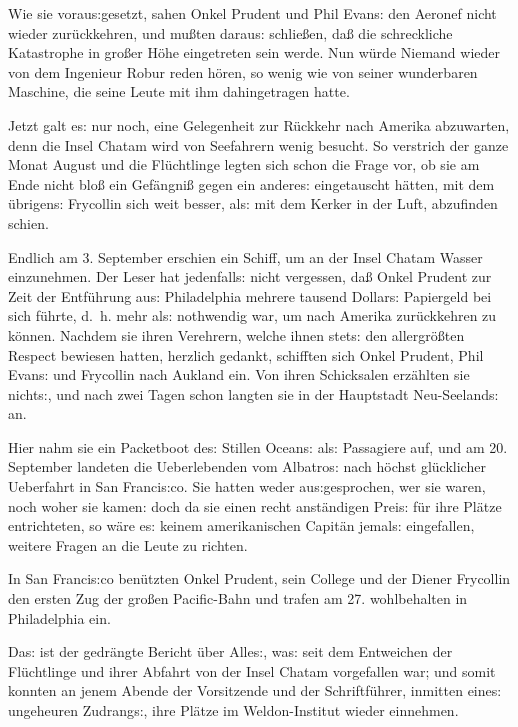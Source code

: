 \documentclass[oneside,12pt]{book}
\newcommand{\s}{s:}
\begin{document}
Wie sie vorau{\s}gesetzt, sahen Onkel Prudent und Phil Evan{\s} den
Aeronef nicht wieder zur\"uckkehren, und mu{\ss}ten darau{\s}
schlie{\ss}en, da{\ss} die schreckliche Katastrophe in gro{\ss}er
H\"ohe eingetreten sein werde. Nun w\"urde Niemand wieder von dem
Ingenieur Robur reden h\"oren, so wenig wie von seiner wunderbaren
Maschine, die seine Leute mit ihm dahingetragen hatte.

Jetzt galt e{\s} nur noch, eine Gelegenheit zur R\"uckkehr nach
Amerika abzuwarten, denn die Insel Chatam wird von Seefahrern wenig
besucht. So verstrich der ganze Monat August und die Fl\"uchtlinge
legten sich schon die Frage vor, ob sie am Ende nicht blo{\ss} ein
Gef\"angni{\ss} gegen ein andere{\s} eingetauscht h\"atten, mit dem
\"ubrigen{\s} Frycollin sich weit besser, al{\s} mit dem
{\glqq}Kerker in der Luft{\grqq}, abzufinden schien.

Endlich am 3. September erschien ein Schiff, um an der Insel Chatam
Wasser einzunehmen. Der Leser hat jedenfall{\s} nicht vergessen,
da{\ss} Onkel Prudent zur Zeit der Entf\"uhrung au{\s} Philadelphia
mehrere tausend Dollar{\s} Papiergeld bei sich f\"uhrte, d.~h. mehr
al{\s} nothwendig war, um nach Amerika zur\"uckkehren zu k\"onnen.
Nachdem sie ihren Verehrern, welche ihnen stet{\s} den
allergr\"o{\ss}ten Respect bewiesen hatten, herzlich gedankt,
schifften sich Onkel Prudent, Phil Evan{\s} und Frycollin nach
Aukland ein. Von ihren Schicksalen erz\"ahlten sie nicht{\s}, und
nach zwei Tagen schon langten sie in der Hauptstadt Neu-Seeland{\s}
an.

Hier nahm sie ein Packetboot de{\s} Stillen Ocean{\s} al{\s}
Passagiere auf, und am 20. September landeten die Ueberlebenden vom
{\glqq}Albatro{\s}{\grqq} nach h\"ochst gl\"ucklicher Ueberfahrt in
San Franci{\s}co. Sie hatten weder au{\s}gesprochen, wer sie waren,
noch woher sie kamen: doch da sie einen recht anst\"andigen Prei{\s}
f\"ur ihre Pl\"atze entrichteten, so w\"are e{\s} keinem
amerikanischen Capit\"an jemal{\s} eingefallen, weitere Fragen an die
Leute zu richten.

In San Franci{\s}co ben\"utzten Onkel Prudent, sein College und der
Diener Frycollin den ersten Zug der gro{\ss}en Pacific-Bahn und
trafen am 27. wohlbehalten in Philadelphia ein.

Da{\s} ist der gedr\"angte Bericht \"uber Alle{\s}, wa{\s} seit dem
Entweichen der Fl\"uchtlinge und ihrer Abfahrt von der Insel Chatam
vorgefallen war; und somit konnten an jenem Abende der Vorsitzende
und der Schriftf\"uhrer, inmitten eine{\s} ungeheuren Zudrang{\s},
ihre Pl\"atze im Weldon-Institut wieder einnehmen.
\end{document}
